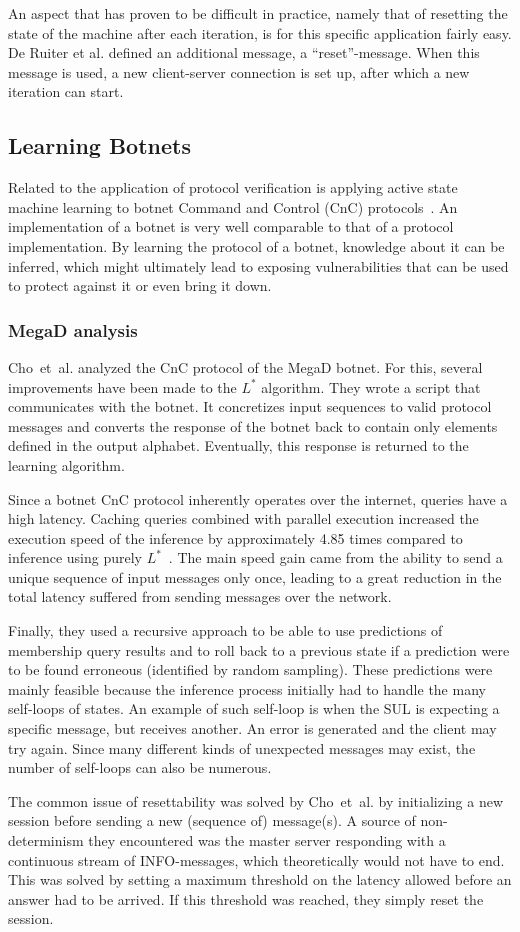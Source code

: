 \documentclass[multi,crop=false,class=article]{standalone}
\begin{document}
An aspect that has proven to be difficult in practice, namely
that of resetting the state of the machine after each iteration, is for this
specific application fairly easy. De Ruiter et al. defined an additional
message, a ``reset''-message. When this message is used, a new client-server 
connection is set up, after which a new iteration can start.

\subsection{Learning Botnets}
Related to the application of protocol verification is applying active state
machine learning to botnet Command and Control (CnC) protocols~\cite{Cho2010}.
An implementation of a botnet is very well comparable to that of a protocol
implementation. By learning the protocol of a botnet, knowledge about it
can be inferred, which might ultimately lead to exposing vulnerabilities
that can be used to protect against it or even bring it down.

\subsubsection{MegaD analysis}
Cho~et~al. analyzed the CnC protocol of the MegaD botnet.
For this, several improvements have been made to the $L^*$ algorithm.
They wrote a script that communicates with the botnet. It concretizes input
sequences to valid protocol messages and converts the response of the botnet
back to contain only elements defined in the output alphabet. Eventually, this
response is returned to the learning algorithm.

Since a botnet CnC protocol inherently operates over the internet, queries have
a high latency. Caching queries combined with parallel execution increased the execution speed
of the inference by approximately 4.85 times compared to inference using purely
$L^*$~\cite{Cho2010}. The main speed gain came from the ability to send
a unique sequence of input messages only once, leading to a great reduction in
the total latency suffered from sending messages over the network.

Finally, they used a recursive approach to be able to use predictions of
membership query results and to roll back to a previous state if a prediction
were to be found erroneous (identified by random sampling). These predictions
were mainly feasible because the inference process initially had to handle the
many self-loops of states. An example of such self-loop is when the SUL is
expecting a specific message, but receives another. An error is generated and
the client may try again. Since many different kinds of unexpected messages may
exist, the number of self-loops can also be numerous.

The common issue of resettability was solved by Cho~et~al. by initializing a
new session before sending a new (sequence of) message(s). A source of
non-determinism they encountered was the master server responding with a
continuous stream of INFO-messages, which theoretically would not have to end.
This was solved by setting a maximum threshold on the latency allowed before an
answer had to be arrived. If this threshold was reached, they simply reset the
session.
\end{document}
